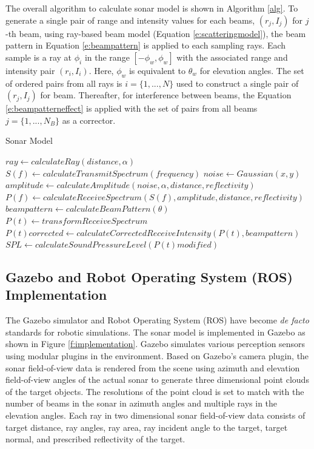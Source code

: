 \documentclass[utf8]{frontiersSCNS} %
\begin{document}
The overall algorithm to calculate sonar model is shown in Algorithm \ref{alg}. To generate a single pair of range and intensity values for each beams, $(r_j,I_j)$ for $j$-th beam, using ray-based beam model (Equation \ref{e:scatteringmodel}), the beam pattern in Equation \ref{e:beampattern} is applied to each sampling rays. Each sample is a ray at $\phi_i$ in the range $[-\phi_w, \phi_w]$ with the associated range and intensity pair $(r_i, I_i)$. Here, $\phi_w$ is equivalent to $\theta_w$ for elevation angles. The set of ordered pairs from all rays is $i=\{1,...,N\}$ used to construct a single pair of $(r_j,I_j)$ for beam. Thereafter, for interference between beams, the Equation \ref{e:beampatterneffect} is applied with the set of pairs from all beams $j=\{1,...,N_B\}$ as a corrector.

\begin{algorithm*}
\caption{Sonar Model}
\begin{algorithmic}
\STATE $ray \leftarrow calculateRay(distance, \alpha)$
\STATE $S(f) \leftarrow calculateTransmitSpectrum(frequency)$
        \STATE $noise \leftarrow Gaussian(x,y)$
        \STATE $amplitude \leftarrow calculateAmplitude(noise, \alpha, distance, reflectivity)$
        \STATE $P(f) \leftarrow calculateReceiveSpectrum(S(f), amplitude, distance, reflectivity)$
    \ENDFOR
    \STATE $beampattern \leftarrow calculateBeamPattern(\theta)$
    \STATE $P(t) \leftarrow transformReceiveSpectrum$
\ENDFOR
\STATE $P(t)corrected \leftarrow calculateCorrectedReceiveIntensity(P(t), beampattern)$
\STATE $SPL \leftarrow calculateSoundPressureLevel(P(t)modified)$
  \label{alg}
\end{algorithmic}
\end{algorithm*}


\subsection{Gazebo and Robot Operating System (ROS) Implementation}
The Gazebo simulator and Robot Operating System (ROS) have become \emph{de facto} standards for robotic simulations. The sonar model is implemented in Gazebo as shown in Figure \ref{f:implementation}. Gazebo simulates various perception sensors using modular plugins in the environment. Based on Gazebo's camera plugin, the sonar field-of-view data is rendered from the scene using azimuth and elevation field-of-view angles of the actual sonar to generate three dimensional point clouds of the target objects. The resolutions of the point cloud is set to match with the number of beams in the sonar in azimuth angles and multiple rays in the elevation angles. Each ray in two dimensional sonar field-of-view data consists of target distance, ray angles, ray area, ray incident angle to the target, target normal, and prescribed reflectivity of the target.
\end{document}
